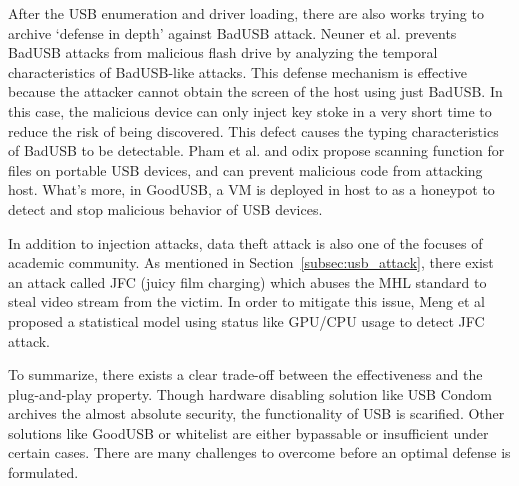 After the USB enumeration and driver loading, there are also works trying to archive `defense in depth' against BadUSB attack.
Neuner et al.\cite{neuner2018usblock} prevents BadUSB attacks from malicious flash drive by analyzing the temporal characteristics of BadUSB-like attacks. This defense mechanism is effective because the attacker cannot obtain the screen of the host using just BadUSB. In this case, the malicious device can only inject key stoke in a very short time to reduce the risk of being discovered. This defect causes the typing characteristics of BadUSB to be detectable.  Pham et al. \cite{pham2010optimizing} and odix\cite{OLEA} propose scanning function for files on portable USB devices, and can prevent malicious code from attacking host. What's more, in GoodUSB, a VM is deployed in host to as a honeypot to detect and stop malicious behavior of USB devices. 

In addition to injection attacks, data theft attack is also one of the focuses of academic community. As mentioned in Section~\ref{subsec:usb_attack}, there exist an attack called JFC (juicy film charging)\cite{JFC} which abuses the MHL standard to steal video stream from the victim. In order to mitigate this issue, Meng et al proposed a statistical model using status like GPU/CPU usage to detect JFC attack\cite{meng2018252}.

To summarize, there exists a clear trade-off between the effectiveness and the plug-and-play property. Though hardware disabling solution like USB Condom archives the almost absolute security, the functionality of USB is scarified. Other solutions like GoodUSB or whitelist are either bypassable or insufficient under certain cases. There are many challenges to overcome before an optimal defense is formulated.


